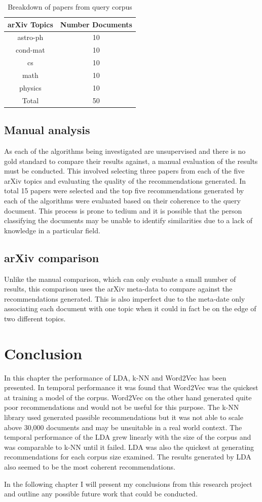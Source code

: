 \begin{table}[h]
    \centering
    \begin{tabular}{|c c|}
         \hline
         arXiv Topics & Number Documents \\ [0.5ex]
         \hline\hline
         astro-ph & 10 \\
         cond-mat & 10 \\
         cs & 10 \\
         math & 10 \\
         physics & 10 \\ [0.5ex]
         \hline\hline
         Total & 50\\ [1ex]
         \hline
    \end{tabular}
    \caption{Breakdown of papers from query corpus}
    \label{table:queryBreakdown}
\end{table}

\subsection{Manual analysis}
As each of the algorithms being investigated are unsupervised and there is no gold standard to compare their results against, a manual evaluation of the results must be conducted.
This involved selecting three papers from each of the five arXiv topics and evaluating the quality of the recommendations generated.
In total 15 papers were selected and the top five recommendations generated by each of the algorithms were evaluated based on their coherence to the query document.
This process is prone to tedium and it is possible that the person classifying the documents may be unable to identify similarities due to a lack of knowledge in a particular field.

\subsection{arXiv comparison}
Unlike the manual comparison, which can only evaluate a small number of results, this comparison uses the arXiv meta-data to compare against the recommendations generated.
This is also imperfect due to the meta-date only associating each document with one topic when it could in fact be on the edge of two different topics.

\section{Conclusion}
In this chapter the performance of LDA, k-NN and Word2Vec has been presented.
In temporal performance it was found that Word2Vec was the quickest at training a model of the corpus.
Word2Vec on the other hand generated quite poor recommendations and would not be useful for this purpose.
The k-NN library used generated passible recommendations but it was not able to scale above 30,000 documents and may be unsuitable in a real world context.
The temporal performance of the LDA grew linearly with the size of the corpus and was comparable to k-NN until it failed.
LDA was also the quickest at generating recommendations for each corpus size examined.
The results generated by LDA also seemed to be the most coherent recommendations.

In the following chapter I will present my conclusions from this research project and outline any possible future work that could be conducted.
